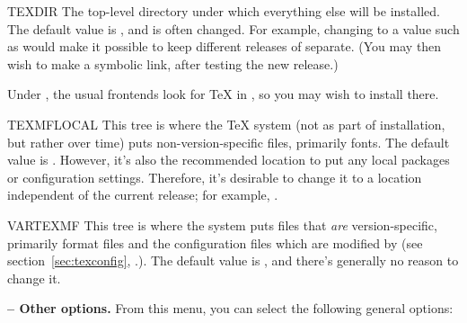 \documentclass{article}
\begin{document}
\begin{ttdescription}
\item [TEXDIR] The top-level directory under which
everything else will be installed.  The default value is
, and is often changed.  For example, changing to a
value such as  would make it possible to
keep different releases of \TL{} separate.  (You may then wish to make
 a symbolic link, after testing the new
release.)

Under \MacOSX, the usual frontends look for \TeX{} in
, so you may wish to install \TL{} there.

\item [TEXMFLOCAL] This tree is where the \TeX{} system (not as part of
installation, but rather over time) puts non-version-specific files,
primarily fonts.  The default value is .
However, it's also the recommended location to put any local packages or
configuration settings.  Therefore, it's desirable to change it to a
location independent of the current \TL{} release; for example,
.

\item [VARTEXMF] This tree is where the system puts files that
\emph{are} version-specific, primarily format files and the
configuration files which are modified by  (see
section~\ref{sec:texconfig}, \p.\pageref{sec:texconfig}).  The default
value is , and there's generally no reason to
change it.

\end{ttdescription}

\textbf{ -- Other options.}  From this menu, you can select
the following general options:
\end{document}
